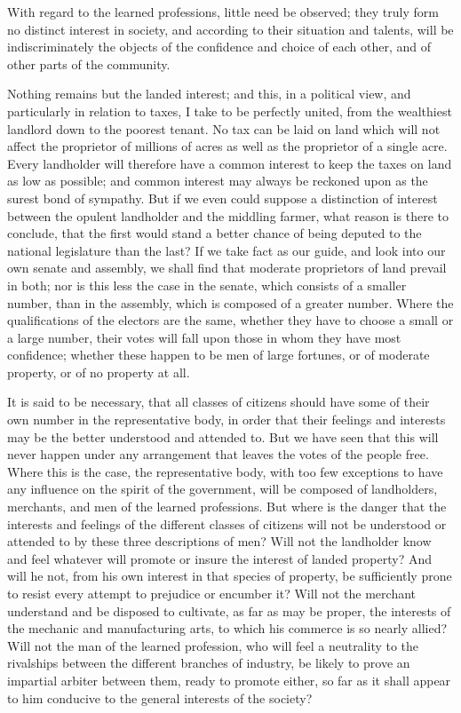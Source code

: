 With regard to the learned professions, little need be observed; they truly form no distinct interest in society, and according to their situation and talents, will be indiscriminately the objects of the confidence and choice of each other, and of other parts of the community.

Nothing remains but the landed interest; and this, in a political view, and particularly in relation to taxes, I take to be perfectly united, from the wealthiest landlord down to the poorest tenant. No tax can be laid on land which will not affect the proprietor of millions of acres as well as the proprietor of a single acre. Every landholder will therefore have a common interest to keep the taxes on land as low as possible; and common interest may always be reckoned upon as the surest bond of sympathy. But if we even could suppose a distinction of interest between the opulent landholder and the middling farmer, what reason is there to conclude, that the first would stand a better chance of being deputed to the national legislature than the last? If we take fact as our guide, and look into our own senate and assembly, we shall find that moderate proprietors of land prevail in both; nor is this less the case in the senate, which consists of a smaller number, than in the assembly, which is composed of a greater number. Where the qualifications of the electors are the same, whether they have to choose a small or a large number, their votes will fall upon those in whom they have most confidence; whether these happen to be men of large fortunes, or of moderate property, or of no property at all.

It is said to be necessary, that all classes of citizens should have some of their own number in the representative body, in order that their feelings and interests may be the better understood and attended to. But we have seen that this will never happen under any arrangement that leaves the votes of the people free. Where this is the case, the representative body, with too few exceptions to have any influence on the spirit of the government, will be composed of landholders, merchants, and men of the learned professions. But where is the danger that the interests and feelings of the different classes of citizens will not be understood or attended to by these three descriptions of men? Will not the landholder know and feel whatever will promote or insure the interest of landed property? And will he not, from his own interest in that species of property, be sufficiently prone to resist every attempt to prejudice or encumber it? Will not the merchant understand and be disposed to cultivate, as far as may be proper, the interests of the mechanic and manufacturing arts, to which his commerce is so nearly allied? Will not the man of the learned profession, who will feel a neutrality to the rivalships between the different branches of industry, be likely to prove an impartial arbiter between them, ready to promote either, so far as it shall appear to him conducive to the general interests of the society?

